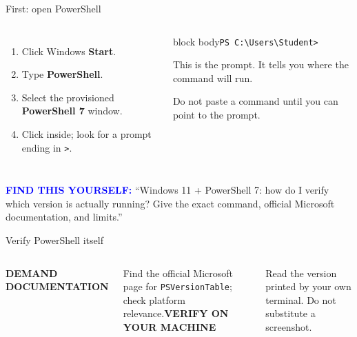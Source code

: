 \documentclass[aspectratio=169,11pt]{beamer}
\begin{document}
\begin{frame}{First: open PowerShell}\begin{columns}[T]\begin{enumerate}\item Click Windows \textbf{Start}.\item Type \textbf{PowerShell}.\item Select the provisioned \textbf{PowerShell 7} window.\item Click inside; look for a prompt ending in \texttt{>}.\end{enumerate}\begin{beamercolorbox}[sep=.8em,wd=\linewidth]{block body}\texttt{PS C:\textbackslash Users\textbackslash Student>}\par\vspace{.3cm}This is the prompt. It tells you where the command will run.\par\vspace{.3cm}Do not paste a command until you can point to the prompt.\end{beamercolorbox}\end{columns}\vspace{.55cm}\textcolor{blue}{\textbf{FIND THIS YOURSELF:}} “Windows 11 + PowerShell 7: how do I verify which version is actually running? Give the exact command, official Microsoft documentation, and limits.”\end{frame}
\begin{frame}{Verify PowerShell itself}\begin{columns}[T]\textbf{DEMAND DOCUMENTATION}\par\scriptsize Find the official Microsoft page for \texttt{PSVersionTable}; check platform relevance.\textbf{VERIFY ON YOUR MACHINE}\par\scriptsize Read the version printed by your own terminal. Do not substitute a screenshot.\end{columns}\end{frame}
\end{document}
